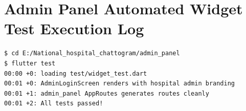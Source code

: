 \documentclass[11pt,a4paper,oneside]{report}
\begin{document}
\section{Admin Panel Automated Widget Test Execution Log}
\begin{lstlisting}[language=bash,caption={Output of flutter test for Standalone Web Admin Panel}]
$ cd E:/National_hospital_chattogram/admin_panel
$ flutter test
00:00 +0: loading test/widget_test.dart
00:01 +0: AdminLoginScreen renders with hospital admin branding
00:01 +1: admin_panel AppRoutes generates routes cleanly
00:01 +2: All tests passed!
\end{lstlisting}
\end{document}
